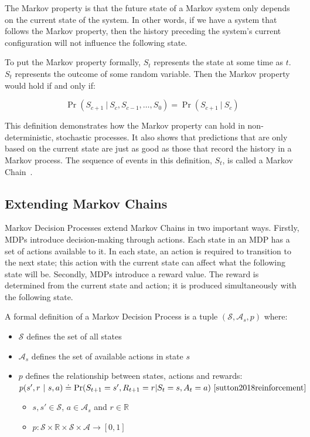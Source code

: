 \documentclass[]{final_report}
\begin{document}
The Markov property is that the future state of a Markov system only depends on the current state of the system. In other words, if we have a system that follows the Markov property, then the history preceding the system's current configuration will not influence the following state.

To put the Markov property formally, $S_t$ represents the state at some time as $t$. $S_t$ represents the outcome of some random variable. Then the Markov property would hold if and only if:


\begin{equation}
  \Pr(S_{c+1}\ |\ S_{c},S_{c-1},\dots,S_0) = \Pr(S_{c+1}\ |\ S_{c})
  \label{eqn:markov-property}
\end{equation}

This definition demonstrates how the Markov property can hold in non-deterministic, stochastic processes. It also shows that predictions that are only based on the current state are just as good as those that record the history in a Markov process. The sequence of events in this definition, $S_t$, is called a Markov Chain~\cite{meyn2012markov}.

\subsection{Extending Markov Chains}

Markov Decision Processes extend Markov Chains in two important ways. Firstly, MDPs introduce decision-making through actions. Each state in an MDP has a set of actions available to it. In each state, an action is required to transition to the next state; this action with the current state can affect what the following state will be. Secondly, MDPs introduce a reward value. The reward is determined from the current state and action; it is produced simultaneously with the following state.

A formal definition of a Markov Decision Process is a tuple $(\mathcal{S},\mathcal{A}_s,p)$ where:
\begin{itemize}
  \item $\mathcal{S}$ defines the set of all states
  \item $\mathcal{A}_s$ defines the set of available actions in state $s$
  \item $p$ defines the relationship between states, actions and rewards: \\
        $p(s',r\ |\ s,a) \doteq \Pr(S_{t+1} = s', R_{t+1} = r | S_t = s, A_t = a)~\cite{sutton2018reinforcement}$
        \begin{itemize}
          \item $s, s' \in \mathcal{S}$, $a \in \mathcal{A}_s$ and $r \in \mathbb{R}$
          \item $p: \mathcal{S} \times \mathbb{R} \times \mathcal{S} \times \mathcal{A} \rightarrow [0,1]$
        \end{itemize}
\end{itemize}
\end{document}
